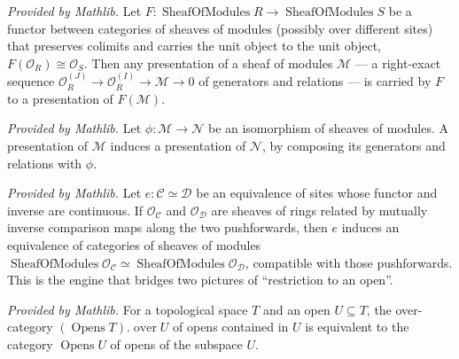 \begin{lemma}
  \label{lem:presentation_map_mathlib}
  \mathlibok
  \textit{Provided by Mathlib.}
  Let \(F : \operatorname{SheafOfModules} R \to \operatorname{SheafOfModules} S\) be a functor between
  categories of sheaves of modules (possibly over different sites) that preserves colimits and carries
  the unit object to the unit object, \(F(\mathcal{O}_R) \cong \mathcal{O}_S\). Then any presentation
  of a sheaf of modules \(\mathcal{M}\) — a right-exact sequence
  \(\mathcal{O}_R^{(J)} \to \mathcal{O}_R^{(I)} \to \mathcal{M} \to 0\) of generators and relations —
  is carried by \(F\) to a presentation of \(F(\mathcal{M})\).
\end{lemma}

\begin{lemma}
  \label{lem:presentation_ofIsIso_mathlib}
  \mathlibok
  \textit{Provided by Mathlib.}
  Let \(\phi : \mathcal{M} \to \mathcal{N}\) be an isomorphism of sheaves of modules. A presentation of
  \(\mathcal{M}\) induces a presentation of \(\mathcal{N}\), by composing its generators and relations
  with \(\phi\).
\end{lemma}

\begin{lemma}
  \label{lem:pushforwardPushforwardEquivalence_mathlib}
  \mathlibok
  \textit{Provided by Mathlib.}
  Let \(e : \mathcal{C} \simeq \mathcal{D}\) be an equivalence of sites whose functor and inverse
  are continuous.  If \(\mathcal{O}_{\mathcal{C}}\) and \(\mathcal{O}_{\mathcal{D}}\) are sheaves of
  rings related by mutually inverse comparison maps along the two pushforwards, then \(e\) induces
  an equivalence of categories of sheaves of modules
  \(\operatorname{SheafOfModules} \mathcal{O}_{\mathcal{C}} \simeq
  \operatorname{SheafOfModules} \mathcal{O}_{\mathcal{D}}\), compatible with those pushforwards.
  This is the engine that bridges two pictures of ``restriction to an open''.
\end{lemma}

\begin{lemma}
  \label{lem:overEquivalence_mathlib}
  \mathlibok
  \textit{Provided by Mathlib.}
  For a topological space \(T\) and an open \(U \subseteq T\), the over-category
  \((\operatorname{Opens} T).\operatorname{over} U\) of opens contained in \(U\) is equivalent to the
  category \(\operatorname{Opens} U\) of opens of the subspace \(U\).
\end{lemma}

